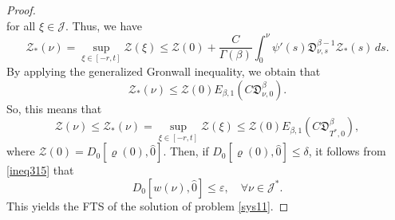 \documentclass[10pt,a4paper]{amsart}
\numberwithin{equation}{section}
\begin{document}
\begin{proof}
\begin{equation}
\end{equation}
for all $\xi \in\mathcal{J}$. Thus, we have
\begin{equation}\label{eq321}
\mathcal{Z}_{*}(\nu )=\sup _{\xi \in[- r, t]} \mathcal{Z}(\xi) 
\leq \mathcal{Z}(0)+\frac{C}{\Gamma(\beta)} \int_0^{\nu } 
\psi'(s)\mathfrak{D}_{\nu ,s}^{\beta-1} \mathcal{Z}_{*}(s)\,ds. 
\end{equation}
By applying the generalized Gronwall inequality, we obtain that
\begin{equation}\label{ineq322}
\mathcal{Z}_{*}(\nu ) \leq \mathcal{Z}(0) E_{\beta, 1}(C\mathfrak{D}_{\nu ,0}^{\beta}).
\end{equation}
So, this means that
$$
\mathcal{Z}(\nu ) \leq \mathcal{Z}_{*}(\nu )=\sup _{\xi \in[- r, t]} 
\mathcal{Z}(\xi) \leq \mathcal{Z}(0) E_{\beta, 1}(C\mathfrak{D}_{T^{*},0}^{\beta}),
$$
where $\mathcal{Z}(0)=D_0[\varrho(0), \hat{0}]$. Then, if 
$D_0[\varrho(0), \hat{0}] \leq \delta$, it follows from \eqref{ineq315} that
$$
D_0[ w(\nu ), \hat{0}] \leq \varepsilon, \quad \forall \nu \in\mathcal{J}^{*} .
$$
This yields the FTS of the solution of problem \eqref{sys11}.
\end{proof}
\end{document}
